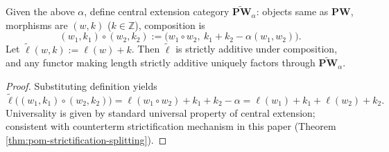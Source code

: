 \begin{theorem}\label{thm:xi-time-central-extension-universal}
Given the above \(\alpha\), define central extension category \(\widetilde{\mathbf{PW}}_{\alpha}\):
objects same as \(\mathbf{PW}\), morphisms are \((w,k)\) (\(k\in\mathbb Z\)), composition is
\[
(w_1,k_1)\circ(w_2,k_2):=
\bigl(w_1\circ w_2,\ k_1+k_2-\alpha(w_1,w_2)\bigr).
\]
Let
\(
\widetilde\ell(w,k):=\ell(w)+k
\).
Then \(\widetilde\ell\) is strictly additive under composition, and any functor making length strictly additive uniquely factors through \(\widetilde{\mathbf{PW}}_{\alpha}\).
\end{theorem}

\begin{proof}
Substituting definition yields
\[
\widetilde\ell\bigl((w_1,k_1)\circ(w_2,k_2)\bigr)
=\ell(w_1\circ w_2)+k_1+k_2-\alpha
=\ell(w_1)+k_1+\ell(w_2)+k_2.
\]
Universality is given by standard universal property of central extension; consistent with counterterm strictification mechanism in this paper (Theorem \ref{thm:pom-strictification-splitting}).
\end{proof}

